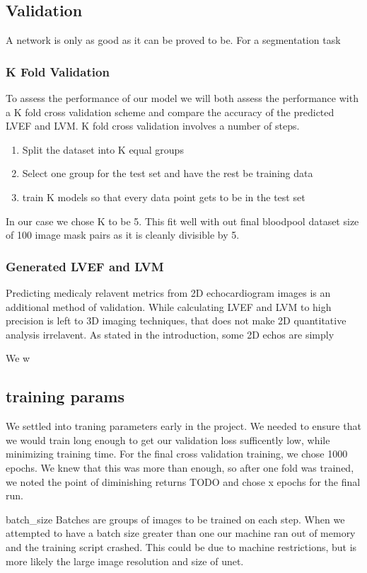 \documentclass[12pt]{article}
\begin{document}
\subsection{Validation}
A network is only as good as it can be proved to be.
For a segmentation task
\subsubsection{K Fold Validation}
To assess the performance of our model we will both assess the performance with a K fold cross validation scheme and compare the accuracy of the predicted LVEF and LVM.
K fold cross validation involves a number of steps.

\begin{enumerate}
	\item{Split the dataset into K equal groups}
	\item{Select one group for the test set and have the rest be training data}
	\item{train K models so that every data point gets to be in the test set}
\end{enumerate}

In our case we chose K to be 5.
This fit well with out final bloodpool dataset size of 100 image mask pairs as it is cleanly divisible by 5.


\subsubsection{Generated LVEF and LVM}
Predicting medicaly relavent metrics from 2D echocardiogram images is an additional method of validation.
While calculating LVEF and LVM to high precision is left to 3D imaging techniques, that does not make 2D quantitative analysis irrelavent.
As stated in the introduction, some 2D echos are simply


We w
\subsection{training params}
We settled into traning parameters early in the project.
We needed to ensure that we would train long enough to get our validation loss sufficently low, while minimizing training time.
For the final cross validation training, we chose 1000 epochs.
We knew that this was more than enough, so after one fold was trained, we noted the point of diminishing returns TODO and chose x epochs for the final run.

batch\_size
Batches are groups of images to be trained on each step.
When we attempted to have a batch size greater than one our machine ran out of memory and the training script crashed.
This could be due to machine restrictions, but is more likely the large image resolution and size of unet.
\end{document}
